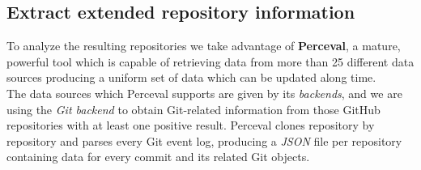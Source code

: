\documentclass[a4paper, 12pt]{book}
\begin{document}
\subsection{Extract extended repository information}
\label{ssec:extract-perceval}
To analyze the resulting repositories we take advantage of \textbf{Perceval}, a mature, powerful tool which
is capable of retrieving data from more than 25 different data sources producing a uniform set of data which can be
updated along time.\\
The data sources which Perceval supports are given by its \emph{backends}, and we are using the \emph{Git backend} to
obtain Git-related information from those GitHub repositories with at least one positive result.
Perceval clones repository by repository and parses every Git event log, producing a \emph{JSON} file
per repository containing data for every commit and its related Git objects.\\
\end{document}
